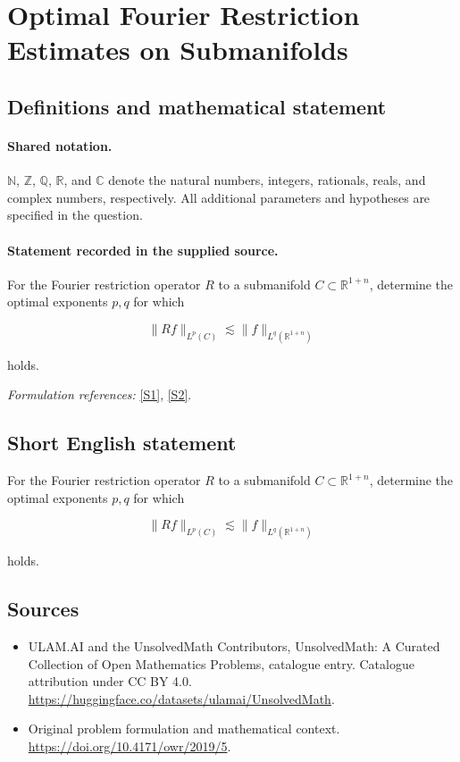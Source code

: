 \documentclass[11pt]{article}
\newcommand{\sref}[2]{\hyperlink{source:#1:#2}{[S#2]}}
\begin{document}
\section{Optimal Fourier Restriction Estimates on Submanifolds}\label{statement}

\subsection{Definitions and mathematical statement}

\paragraph{Shared notation.}$\mathbb N$, $\mathbb Z$, $\mathbb Q$, $\mathbb R$, and $\mathbb C$ denote the natural numbers, integers, rationals, reals, and complex numbers, respectively. All additional parameters and hypotheses are specified in the question.


\paragraph{Statement recorded in the supplied source.}
For the Fourier restriction operator $R$ to a submanifold $C\subset\mathbb R^{1+n}$, determine the optimal exponents $p,q$ for which

$$\lVert Rf\rVert_{L^p(C)}\lesssim\lVert f\rVert_{L^q(\mathbb R^{1+n})}$$

holds.
\par\smallskip\textit{Formulation references:} \sref{statement}{1}, \sref{statement}{2}.
\subsection{Short English statement}
For the Fourier restriction operator $R$ to a submanifold $C\subset\mathbb R^{1+n}$, determine the optimal exponents $p,q$ for which

$$\lVert Rf\rVert_{L^p(C)}\lesssim\lVert f\rVert_{L^q(\mathbb R^{1+n})}$$

holds.
\subsection{Sources}
\begin{itemize}
\item[\hypertarget{source:statement:1}{S1}] ULAM.AI and the UnsolvedMath Contributors, UnsolvedMath: A Curated Collection of Open Mathematics Problems, catalogue entry. Catalogue attribution under CC BY 4.0.
\url{https://huggingface.co/datasets/ulamai/UnsolvedMath}.
\item[\hypertarget{source:statement:2}{S2}] Original problem formulation and mathematical context.
\url{https://doi.org/10.4171/owr/2019/5}.
\end{itemize}
\label{end:statement}
\end{document}
